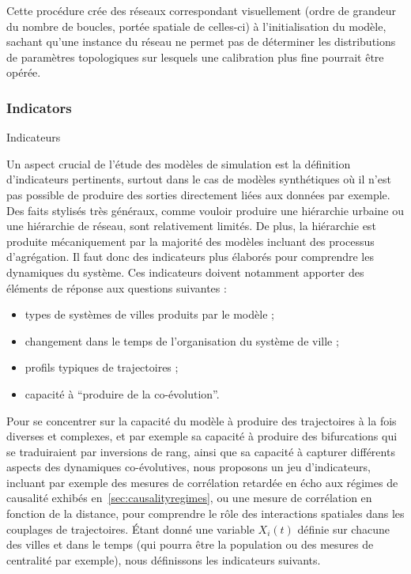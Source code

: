 Cette procédure crée des réseaux correspondant visuellement (ordre de grandeur du nombre de boucles, portée spatiale de celles-ci) à l'initialisation du modèle, sachant qu'une instance du réseau ne permet pas de déterminer les distributions de paramètres topologiques sur lesquels une calibration plus fine pourrait être opérée.



\subsubsection{Indicators}{Indicateurs}

Un aspect crucial de l'étude des modèles de simulation est la définition d'indicateurs pertinents, surtout dans le cas de modèles synthétiques où il n'est pas possible de produire des sorties directement liées aux données par exemple. Des faits stylisés très généraux, comme vouloir produire une hiérarchie urbaine ou une hiérarchie de réseau, sont relativement limités. De plus, la hiérarchie est produite mécaniquement par la majorité des modèles incluant des processus d'agrégation. Il faut donc des indicateurs plus élaborés pour comprendre les dynamiques du système. Ces indicateurs doivent notamment apporter des éléments de réponse aux questions suivantes : 
 \begin{itemize}
 	\item types de systèmes de villes produits par le modèle ;
 	\item changement dans le temps de l'organisation du système de ville ;
 	\item profils typiques de trajectoires ;
 	\item capacité à ``produire de la co-évolution''.
 \end{itemize}


Pour se concentrer sur la capacité du modèle à produire des trajectoires à la fois diverses et complexes, et par exemple sa capacité à produire des bifurcations qui se traduiraient par inversions de rang, ainsi que sa capacité à capturer différents aspects des dynamiques co-évolutives, nous proposons un jeu d'indicateurs, incluant par exemple des mesures de corrélation retardée en écho aux régimes de causalité exhibés en~\ref{sec:causalityregimes}, ou une mesure de corrélation en fonction de la distance, pour comprendre le rôle des interactions spatiales dans les couplages de trajectoires. Étant donné une variable $X_i(t)$ définie sur chacune des villes et dans le temps (qui pourra être la population ou des mesures de centralité par exemple), nous définissons les indicateurs suivants.

